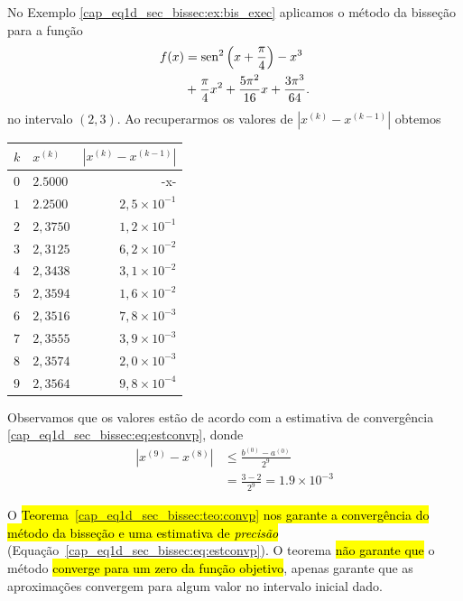 \begin{ex}\label{cap_eq1d_sec_bissec:ex:bis_convp}
  No Exemplo \ref{cap_eq1d_sec_bissec:ex:bis_exec} aplicamos o método da bisseção para a função
  \begin{equation}
    \begin{aligned}
      f(x) &= \operatorname{sen}^2\left(x+\frac{\pi}{4}\right) - x^3 \\
           &+ \frac{\pi}{4}x^2 + \frac{5\pi^2}{16}x + \frac{3\pi^3}{64}.
    \end{aligned}
\end{equation}
no intervalo $(2, 3)$. Ao recuperarmos os valores de $\left|x^{(k)}-x^{(k-1)}\right|$ obtemos
\begin{center}
  \begin{tabular}[H]{l|l|r}
    $k$ & $x^{(k)}$ & $\left|x^{(k)}-x^{(k-1)}\right|$\\\hline
    $0$ & $2.5000$ & -x-\\
    $1$ & $2.2500$ & $2,5\times 10^{-1}$\\
    $2$ & $2,3750$ & $1,2\times 10^{-1}$\\
    $3$ & $2,3125$ & $6,2\times 10^{-2}$\\
    $4$ & $2,3438$ & $3,1\times 10^{-2}$\\
    $5$ & $2,3594$ & $1,6\times 10^{-2}$\\
    $6$ & $2,3516$ & $7,8\times 10^{-3}$\\
    $7$ & $2,3555$ & $3,9\times 10^{-3}$\\
    $8$ & $2,3574$ & $2,0\times 10^{-3}$\\
    $9$ & $2,3564$ & $9,8\times 10^{-4}$\\\hline
  \end{tabular}
\end{center}

Observamos que os valores estão de acordo com a estimativa de convergência \ref{cap_eq1d_sec_bissec:eq:estconvp}, donde
\begin{align}
  |x^{(9)}-x^{(8)}| &\leq \frac{b^{(0)}-a^{(0)}}{2^{9}}\\
                     &= \frac{3 - 2}{2^{9}} = 1.9\times 10^{-3}
\end{align}
\end{ex}

O \hl{Teorema~{\ref{cap_eq1d_sec_bissec:teo:convp}} nos garante a convergência do método da bisseção e uma estimativa de \emph{precisão}} (Equação~\ref{cap_eq1d_sec_bissec:eq:estconvp}). O teorema \hl{não garante que} o método \hl{converge para um zero da função objetivo}, apenas garante que as aproximações convergem para algum valor no intervalo inicial dado.

